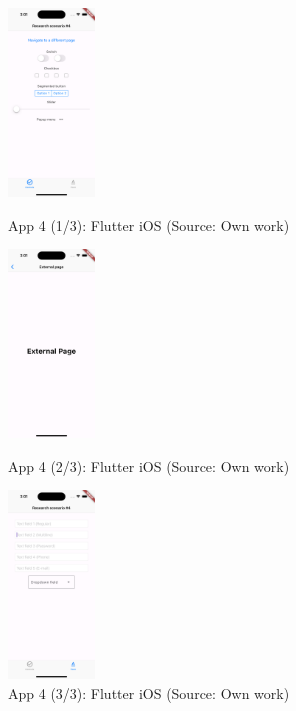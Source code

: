 \begin{figure}[H]
  \begin{minipage}{.31\textwidth}
    \centering
    \includegraphics[height=50mm]{img/app4_1_flutter_ios}
    \caption{App 4 (1/3): Flutter iOS (Source: Own work)}
    \label{fig:app4_1_flutter_ios}
  \end{minipage}
  \hfill
  \begin{minipage}{.31\textwidth}
    \centering
    \includegraphics[height=50mm]{img/app4_2_flutter_ios}
    \caption{App 4 (2/3): Flutter iOS (Source: Own work)}
    \label{fig:app4_2_flutter_ios}
  \end{minipage}
  \hfill
  \begin{minipage}{.31\textwidth}
    \centering
    \includegraphics[height=50mm]{img/app4_3_flutter_ios}
    \caption{App 4 (3/3): Flutter iOS (Source: Own work)}
    \label{fig:app4_3_flutter_ios}
  \end{minipage}
\end{figure}

